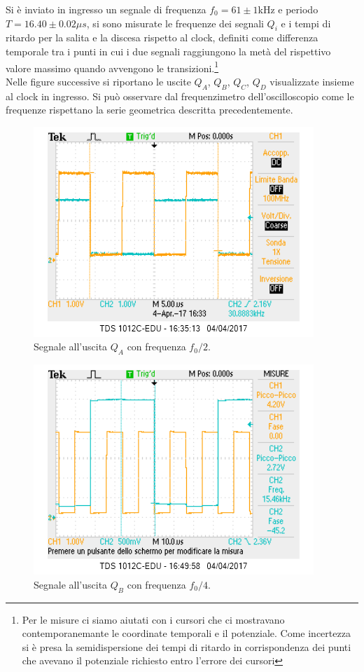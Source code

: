 \documentclass[10pt,a4paper]{article}
\begin{document}
Si è inviato in ingresso un segnale di frequenza $f_0 = 61 \pm 1$kHz e periodo $T = 16.40 \pm 0.02 \mu s$, si sono misurate le frequenze dei segnali $Q_i$ e i tempi di ritardo per la salita e la discesa rispetto al clock, definiti come differenza temporale tra i punti in cui i due segnali raggiungono la metà del rispettivo valore massimo quando avvengono le transizioni.\footnote{Per le misure ci siamo aiutati con i cursori che ci mostravano contemporanemante le coordinate temporali e il potenziale. Come incertezza si è presa la semidispersione dei tempi di ritardo in corrispondenza dei punti che avevano il potenziale richiesto entro l'errore dei cursori}\\

Nelle figure successive si riportano le uscite $Q_A$, $Q_B$, $Q_C$, $Q_D$ visualizzate insieme al clock in ingresso. Si può osservare dal frequenzimetro dell'oscilloscopio come le frequenze rispettano la serie geometrica descritta precedentemente.\\

\begin{figure}
\centering
\includegraphics[scale=1.0]{QA1-2.png}
\caption{Segnale all'uscita $Q_A$ con frequenza $f_0/2$.\label{freq2}}
\end{figure}

\begin{figure}
\centering
\includegraphics[scale=1.0]{QB1-4.png}
\caption{Segnale all'uscita $Q_B$ con frequenza $f_0/4$.\label{freq4}}
\end{figure}
\end{document}
